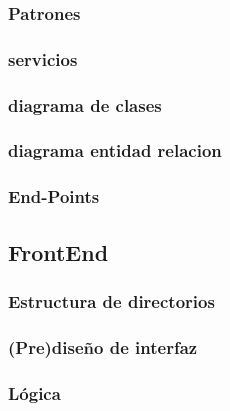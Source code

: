     \subsubsection{Patrones}
    
    \subsubsection{servicios}
    
    \subsubsection{diagrama de clases}
    
    \subsubsection{diagrama entidad relacion}

    \subsubsection{End-Points}
    
\subsection{FrontEnd}

    \subsubsection{Estructura de directorios}
    
    \subsubsection{ (Pre)diseño de interfaz }
    
    \subsubsection{ Lógica }